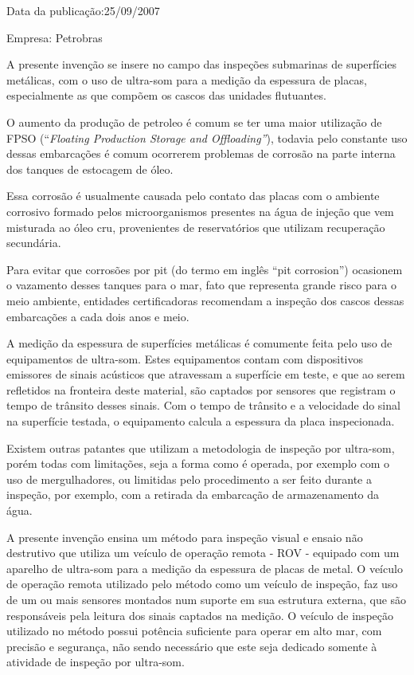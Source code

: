 \documentclass[a4paper,12pt]{article}
\begin{document}
 Data da publicação:25/09/2007
 
 Empresa: Petrobras
 
 \vspace{1,0cm}
 
 A presente invenção se insere no campo das inspeções submarinas
de superfícies metálicas, com o uso de ultra-som para a medição da
espessura de placas, especialmente as que compõem os cascos das
unidades flutuantes.

O aumento da produção de petroleo é comum se ter uma maior utilização de FPSO (“\textit{Floating Production Storage and Offloading”}), todavia pelo constante uso dessas embarcações é comum ocorrerem problemas de corrosão na parte interna dos tanques de estocagem de óleo.

Essa corrosão é usualmente causada pelo contato das placas com o
ambiente corrosivo formado pelos microorganismos presentes na água de
injeção que vem misturada ao óleo cru, provenientes de reservatórios que
utilizam recuperação secundária.

Para evitar que corrosões por pit (do termo em inglês “pit
corrosion”) ocasionem o vazamento desses tanques para o mar, fato que
representa grande risco para o meio ambiente, entidades certificadoras
recomendam a inspeção dos cascos dessas embarcações a cada dois anos
e meio.

A medição da espessura de superfícies metálicas é comumente feita
pelo uso de equipamentos de ultra-som. Estes equipamentos contam com
dispositivos emissores de sinais acústicos que atravessam a superfície em
teste, e que ao serem refletidos na fronteira deste material, são captados
por sensores que registram o tempo de trânsito desses sinais. Com o tempo
de trânsito e a velocidade do sinal na superfície testada, o equipamento
calcula a espessura da placa inspecionada.

Existem outras patantes que utilizam a metodologia de inspeção por ultra-som, porém todas com limitações, seja a forma como é operada, por exemplo com o uso de mergulhadores, ou limitidas pelo procedimento a ser feito durante a inspeção, por exemplo, com a retirada da embarcação de armazenamento da água.


A presente invenção ensina um método para inspeção visual e ensaio não
destrutivo que utiliza um veículo de operação remota - ROV - equipado
com um aparelho de ultra-som para a medição da espessura de placas de
metal.
O veículo de operação remota utilizado pelo método como um veículo
de inspeção, faz uso de um ou mais sensores montados num suporte em
sua estrutura externa, que são responsáveis pela leitura dos sinais captados
na medição. O veículo de inspeção utilizado no método possui potência suficiente
para operar em alto mar, com precisão e segurança, não sendo necessário
que este seja dedicado somente à atividade de inspeção por ultra-som.
\end{document}
